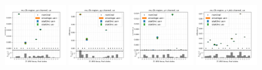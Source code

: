 \begin{figure}
    \includegraphics[width=0.24\textwidth]{appendices/ttSystReweighting/figures/afterCorr/icata1_ch0_ue.png}
    \includegraphics[width=0.24\textwidth]{appendices/ttSystReweighting/figures/afterCorr/icata1_ch1_ue.png}
    \includegraphics[width=0.24\textwidth]{appendices/ttSystReweighting/figures/afterCorr/icata1_ch2_ue.png}
    \includegraphics[width=0.24\textwidth]{appendices/ttSystReweighting/figures/afterCorr/icata1_ch3_ue.png}
    

\end{figure}
